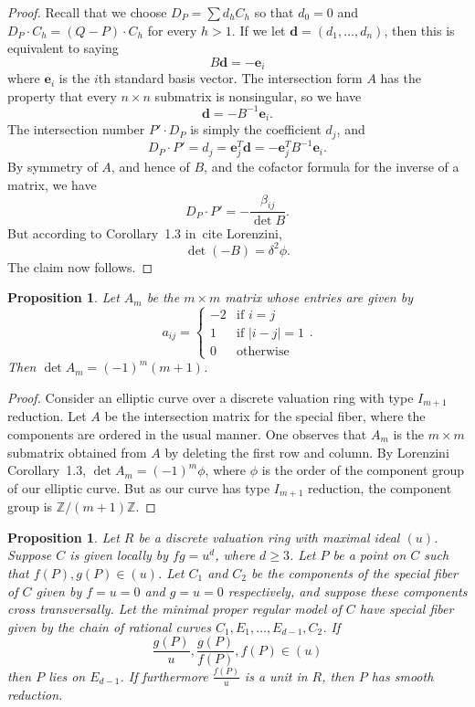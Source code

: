 \documentclass[pagesize,paper=letter]{scrartcl}
\newtheorem{proposition}[thm]{Proposition}
\theoremstyle{definition}
\theoremstyle{remark}
\newcommand{\vd}{\mathbf{d}}
\newcommand{\ve}{\mathbf{e}}
\def\Z{\mathbb{Z}}
\begin{document}
\begin{proof}
  Recall that we choose $D_P = \sum d_h C_h$ so that $d_0 = 0$ and $D_P \cdot C_h = (Q - P) \cdot C_h$ for every $h > 1$. If we let $\vd = (d_1, \dots, d_n)$, then this is equivalent to saying
  \[
  B\vd = -\ve_i
  \]
  where $\ve_i$ is the $i$th standard basis vector. The intersection form $A$ has the property that every $n \times n$ submatrix is nonsingular, so we have
  \[
  \vd = -B^{-1}\ve_i.
  \]
  The intersection number $P' \cdot D_P$ is simply the coefficient $d_j$, and
  \[
  D_P \cdot P' = d_j = \ve_j^T \vd = -\ve_j^TB^{-1}\ve_i.
  \]
  By symmetry of $A$, and hence of $B$, and the cofactor formula for the inverse of a matrix, we have
  \[
  D_P \cdot P' = - \frac{\beta_{ij}}{\det B}.
  \]
  But according to Corollary~1.3 in~cite Lorenzini,
  \[
  \det (-B) = \delta^2 \phi.
  \]
  The claim now follows.
\end{proof}

\begin{proposition}\label{prop:am-defn-det}
  Let $A_m$ be the $m \times m$ matrix whose entries are given by
  \[
  a_{ij} = \begin{cases}
    -2 & \text{if } i = j \\
    1 & \text{if } |i - j| = 1\\
    0 & \text{otherwise}
  \end{cases}.
  \]
  Then $\det A_m = (-1)^m (m+1)$.
\end{proposition}

\begin{proof}
  Consider an elliptic curve over a discrete valuation ring with type $I_{m+1}$ reduction. Let $A$ be the intersection matrix for the special fiber, where the components are ordered in the usual manner. One observes that $A_m$ is the $m \times m$ submatrix obtained from $A$ by deleting the first row and column. By Lorenzini Corollary~1.3, $\det A_m = (-1)^m \phi$, where $\phi$ is the order of the component group of our elliptic curve. But as our curve has type $I_{m+1}$ reduction, the component group is $\Z/(m+1)\Z$.
\end{proof}

\begin{proposition}\label{prop:fg-equals-u-blow-up}
  Let $R$ be a discrete valuation ring with maximal ideal $(u)$. Suppose $C$ is given locally by $fg = u^d$, where $d \geq 3$. Let $P$ be a point on $C$ such that $f(P), g(P) \in (u)$. Let $C_1$ and $C_2$ be the components of the special fiber of $C$ given by $f = u = 0$ and $g = u = 0$ respectively, and suppose these components cross transversally. Let the minimal proper regular model of $C$ have special fiber given by the chain of rational curves $C_1, E_1, \dots, E_{d-1}, C_2$. If
  \[
  \frac{g(P)}{u}, \frac{g(P)}{f(P)}, f(P) \in (u)
  \]
  then $P$ lies on $E_{d-1}$. If furthermore $\frac{f(P)}{u}$ is a unit in $R$, then $P$ has smooth reduction.
\end{proposition}
\end{document}
